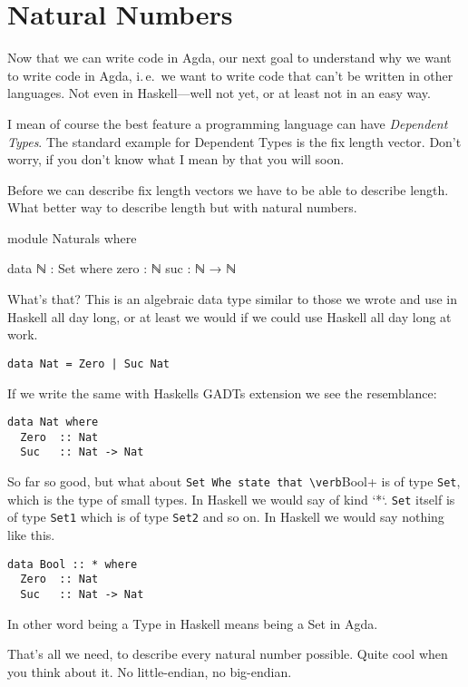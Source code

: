 \section{Natural Numbers}
Now that we can write code in Agda, our next goal to understand why we
want to write code in Agda, i. e. we want to write code that can’t be
written in other languages. Not even in Haskell—well not yet, or at
least not in an easy way.

I mean of course the best feature a programming language can have
\emph{Dependent Types}. The standard example for Dependent Types is the
fix length vector. Don’t worry, if you don’t know what I mean by that
you will soon.

Before we can describe fix length vectors we have to be able to describe
length. What better way to describe length but with natural numbers.

\begin{code}
module Naturals where

data ℕ : Set where
  zero : ℕ
  suc  : ℕ → ℕ
\end{code}

What's that? This is an algebraic data type similar to those we wrote and use
in Haskell all day long, or at least we would if we could use Haskell all day
long at work.

\begin{verbatim}
data Nat = Zero | Suc Nat
\end{verbatim}

If we write the same with Haskells GADTs extension we see the resemblance:

\begin{verbatim}
data Nat where
  Zero  :: Nat
  Suc   :: Nat -> Nat
\end{verbatim}

So far so good, but what about \verb+Set Whe state that \verb+Bool+ is of type
\verb+Set+, which is the type of small types. In Haskell we would say of kind `*`.
\verb+Set+ itself is of type \verb+Set1+ which is of type \verb+Set2+ and so on. In Haskell
we would say nothing like this.

\begin{verbatim}
data Bool :: * where
  Zero  :: Nat
  Suc   :: Nat -> Nat
\end{verbatim}

In other word being a Type in Haskell means being a Set in Agda.

That's all we need, to describe every natural number possible.
Quite cool when you think about it. No little-endian, no big-endian.

